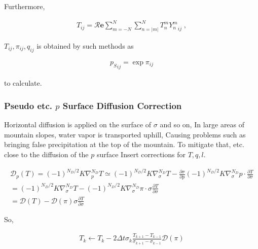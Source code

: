 Furthermore,

\begin{eqnarray}
  T_{ij}
   =  {\mathcal R}\mathbf{e} \sum_{m=-N}^{N} \sum_{n=|m|}^{N}
      T_n^m  {Y_n^m}_{ij} \; ,
\end{eqnarray}

\(T_{ij}, \pi_{ij}, q_{ij}\) is obtained by such methods as

\begin{eqnarray}
  {p_S}_{ij} = \exp \pi_{ij}
\end{eqnarray}

to calculate.

\hypertarget{pseudo-etc.-p-surface-diffusion-correction}{%
\subsubsection{\texorpdfstring{Pseudo etc. \(p\) Surface Diffusion
Correction}{Pseudo etc. p Surface Diffusion Correction}}\label{pseudo-etc.-p-surface-diffusion-correction}}

Horizontal diffusion is applied on the surface of \(\sigma\) and so on,
In large areas of mountain slopes, water vapor is transported uphill,
Causing problems such as bringing false precipitation at the top of the
mountain. To mitigate that, etc. close to the diffusion of the \(p\)
surface Insert corrections for \(T,q,l\).

\begin{eqnarray}
  {\mathcal D}_p (T) = (-1)^{N_D/2} K \nabla^{N_D}_p T  
                \simeq  (-1)^{N_D/2} K \nabla^{N_D}_{\sigma} T  
                      - \frac{\partial \sigma}{\partial p}
                      (-1)^{N_D/2} K \nabla^{N_D}_{\sigma} p
                      \cdot \frac{\partial T}{\partial \sigma}                   \\
                =      (-1)^{N_D/2} K \nabla^{N_D}_{\sigma} T  
                    -  (-1)^{N_D/2} K \nabla^{N_D}_{\sigma} \pi
                          \cdot \sigma \frac{\partial T}{\partial \sigma}  \\
                =    {\mathcal D} (T)
                    -  {\mathcal D} (\pi)
                       \sigma \frac{\partial T}{\partial \sigma}
\end{eqnarray}

So,

\begin{eqnarray}
  T_k \leftarrow  T_k
       -  2 \Delta t
        \sigma_{k} \frac{T_{k+1}-T_{k-1}}{\sigma_{k+1} - \sigma_{k-1}}
        {\mathcal D}(\pi)
\end{eqnarray}

